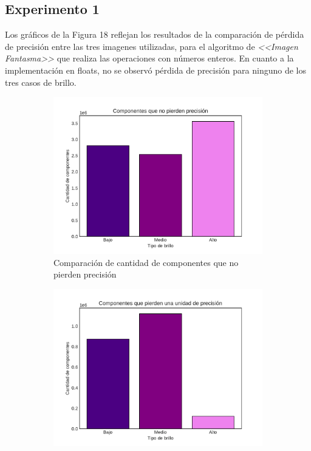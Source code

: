 \documentclass[a4paper]{article}
\begin{document}
\subsection{Experimento 1}

\justify
Los gráficos de la Figura 18 reflejan los resultados de la comparación de pérdida de precisión entre las tres imagenes utilizadas, para el algoritmo de \textit{<<Imagen Fantasma>>} que realiza las operaciones con números enteros. En cuanto a la implementación en floats, no se observó pérdida de precisión para ninguno de los tres casos de brillo.
 
\begin{figure}[b!]
	\centering
	\begin{subfigure}{0.49 \textwidth}
		\includegraphics[width=\textwidth]{img/Precision0.pdf}
			\caption{Comparación de cantidad de componentes que no pierden precisión}
	\end{subfigure}
	\hfill
	\begin{subfigure}{0.49 \textwidth}
		\includegraphics[width=\textwidth]{img/Precision1.pdf}

\end{subfigure}
\end{figure}
\end{document}
